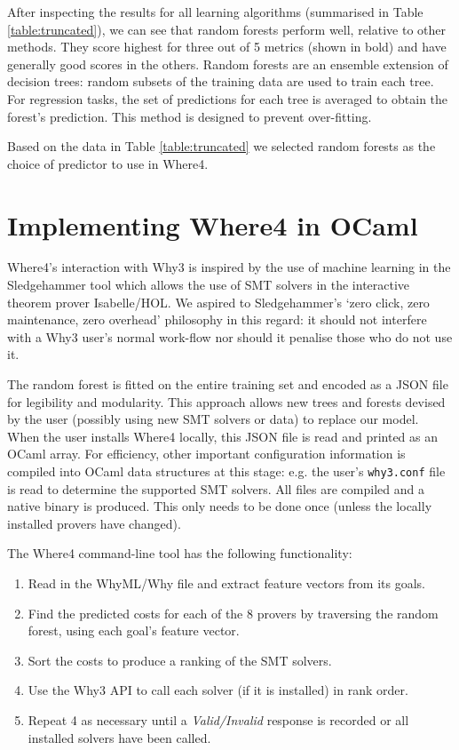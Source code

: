 \documentclass[runningheads,a4paper]{llncs}
\begin{document}
After inspecting the results for all learning algorithms (summarised in Table \ref{table:truncated}), we can see that random forests \cite{RandomForests} perform well, relative to other methods. They score highest for three out of 5 metrics (shown in bold) and have generally good scores in the others. Random forests are an ensemble extension of decision trees: random subsets of the training data are used to train each tree. For regression tasks, the set of predictions for each tree is averaged to obtain the forest's prediction. This method is designed to prevent over-fitting. 

Based on the data in Table \ref{table:truncated} we selected random forests as the choice of predictor to use in \textsf{Where4}.   



\section{Implementing \textsf{Where4} in OCaml}

\textsf{Where4}'s interaction with \textsf{Why3} is inspired by the use of machine learning in the Sledgehammer tool \cite{Sledgehammer} which allows the use of SMT solvers in the interactive theorem prover Isabelle/HOL. We aspired to Sledgehammer's `zero click, zero maintenance, zero overhead' philosophy in this regard: it should not interfere with a \textsf{Why3} user's normal work-flow nor should it penalise those who do not use it.

The random forest is fitted on the entire training set and encoded as a JSON file for legibility and modularity. This approach allows new trees and forests devised by the user (possibly using new SMT solvers or data) to replace our model.  When the user installs \textsf{Where4} locally, this JSON file is read and printed as an OCaml array. For efficiency, other important configuration information is compiled into OCaml data structures at this stage: e.g. the user's \texttt{why3.conf} file is read to determine the supported SMT solvers. All files are compiled and a native binary is produced. This only needs to be done once (unless the locally installed provers have changed). 

The \textsf{Where4} command-line tool has the following functionality:
\begin{enumerate}
\item Read in the WhyML/Why file and extract feature vectors from its goals.%
\item Find the predicted costs for each of the 8 provers by traversing the random forest, using each goal's feature vector.
\item Sort the costs to produce a ranking of the SMT solvers.
\item Use the \textsf{Why3} API to call each solver (if it is installed) in rank order.
\item Repeat 4 as necessary until a \textit{Valid/Invalid} response is recorded or all installed solvers have been called.
\end{enumerate}
\end{document}
